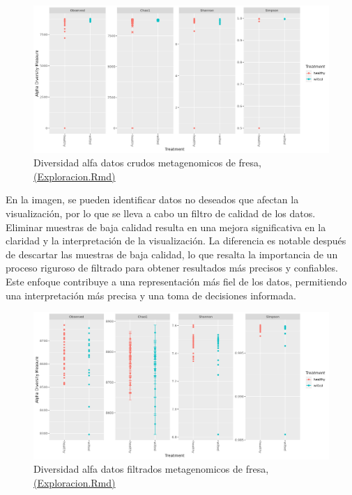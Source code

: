 \begin{figure}[h]
\centering
\includegraphics[width=\textwidth]{Img/cap2/DiversidadAlfaFresaKraken.png}
\caption{Diversidad alfa datos crudos metagenomicos de fresa, \href{https://github.com/CamilaSilva1995/Tesis_Maestria/blob/main/Analisis_Comparativo/Fresa_Solena/01_Exploracion.Rmd}{(Exploracion.Rmd)} }
\end{figure}

En la imagen, se pueden identificar datos no deseados que afectan la visualización, por lo que se lleva a cabo un filtro de calidad de los datos.\\

Eliminar muestras de baja calidad resulta en una mejora significativa en la claridad y la interpretación de la visualización. La diferencia es notable después de descartar las muestras de baja calidad, lo que resalta la importancia de un proceso riguroso de filtrado para obtener resultados más precisos y confiables. Este enfoque contribuye a una representación más fiel de los datos, permitiendo una interpretación más precisa y una toma de decisiones informada.\\

\begin{figure}[h]
\centering
\includegraphics[width=\textwidth]{Img/cap2/DiversidadAlfaFresaKraken_fil.png}
\caption{Diversidad alfa datos filtrados metagenomicos de fresa, \href{https://github.com/CamilaSilva1995/Tesis_Maestria/blob/main/Analisis_Comparativo/Fresa_Solena/01_Exploracion.Rmd}{(Exploracion.Rmd)} }
\end{figure}

